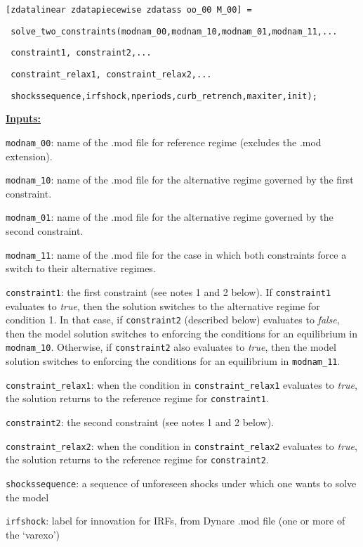 \documentclass[12pt]{article}
\begin{document}
\begin{enumerate}
\texttt{[zdatalinear zdatapiecewise zdatass oo\_00 M\_00] = }

\texttt{\
solve\_two\_constraints(modnam\_00,modnam\_10,modnam\_01,modnam\_11,...}

\texttt{\ constraint1, constraint2,...}

\texttt{\ constraint\_relax1, constraint\_relax2,...}

\texttt{\ shockssequence,irfshock,nperiods,curb\_retrench,maxiter,init);}

\medskip

\underline{\textbf{Inputs:}}

\texttt{modnam\_00}: name of the .mod file for reference regime (excludes the .mod extension).

\texttt{modnam\_10}: name of the .mod file for the alternative regime governed by the first constraint.

\texttt{modnam\_01}: name of the .mod file for the alternative regime governed by the second constraint.

\texttt{modnam\_11}: name of the .mod file for the case in which both constraints force a switch to their alternative regimes.

\texttt{constraint1}: the first constraint (see notes 1 and 2 below). If \texttt{constraint1} evaluates to \emph{true}, then the solution switches to the alternative regime for condition 1. In that case, if \texttt{constraint2} (described below) evaluates to \emph{false}, then the model solution switches to enforcing the conditions for an equilibrium in \texttt{modnam\_10}.
Otherwise, if \texttt{constraint2} also evaluates to \emph{true}, then the model solution switches to enforcing the conditions for an equilibrium in \texttt{modnam\_11}.

\texttt{constraint\_relax1}: when the condition in \texttt{constraint\_relax1} evaluates to \emph{true}, the solution returns to the reference regime for \texttt{constraint1}.

\texttt{constraint2}: the second constraint (see notes 1 and 2 below).

\texttt{constraint\_relax2}: when the condition in \texttt{constraint\_relax2} evaluates to \emph{true}, the solution returns to the reference regime for \texttt{constraint2}.

\texttt{shockssequence}: a sequence of unforeseen shocks under which one
wants to solve the model

\texttt{irfshock}: label for innovation for IRFs, from Dynare .mod file (one
or more of the `varexo')


\end{enumerate}
\end{document}
